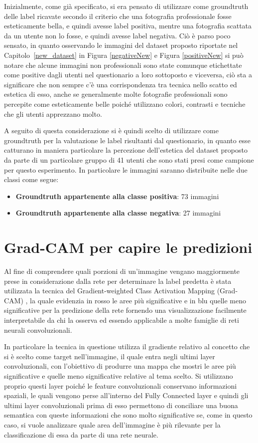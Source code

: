 Inizialmente, come già specificato, si era pensato di utilizzare come groundtruth delle label ricavate secondo il criterio che una fotografia professionale fosse esteticamente bella, e quindi avesse label positiva, mentre una fotografia scattata da un utente non lo fosse, e quindi avesse label negativa. Ciò è parso poco sensato, in quanto osservando le immagini del dataset proposto riportate nel Capitolo~\ref{new_dataset} in Figura \ref{negativeNew} e Figura \ref{positiveNew} si può notare che alcune immagini non professionali sono state comunque etichettate come positive dagli utenti nel questionario a loro sottoposto e viceversa, ciò sta a significare che non sempre c'è una corrispondenza tra tecnica nello scatto ed estetica di esso, anche se generalmente molte fotografie professionali sono percepite come esteticamente belle poiché utilizzano colori, contrasti e tecniche che gli utenti apprezzano molto.

A seguito di questa considerazione si è quindi scelto di utilizzare come groundtruth per la valutazione le label risultanti dal questionario, in quanto esse catturano in maniera particolare la percezione dell'estetica del dataset proposto da parte di un particolare gruppo di 41 utenti che sono stati presi come campione per questo esperimento. In particolare le immagini saranno distribuite nelle due classi come segue:
\begin{itemize}
\item \textbf{Groundtruth appartenente alla classe positiva}: 73 immagini
\item \textbf{Groundtruth appartenente alla classe negativa}: 27 immagini
\end{itemize}


\section{Grad-CAM per capire le predizioni}

Al fine di comprendere quali porzioni di un'immagine vengano maggiormente prese in considerazione dalla rete per determinare la label predetta è stata utilizzata la tecnica del Gradient-weighted Class Activation Mapping (Grad-CAM) \cite{selvaraju2017grad}, la quale evidenzia in rosso le aree più significative e in blu quelle meno significative per la predizione della rete fornendo una visualizzazione facilmente interpretabile da chi la osserva ed essendo applicabile a molte famiglie di reti neurali convoluzionali. 

In particolare la tecnica in questione utilizza il gradiente relativo al concetto che si è scelto come target nell'immagine, il quale entra negli ultimi layer convoluzionali, con l'obiettivo di produrre una mappa che mostri le aree più significative e quelle meno significative relative al tema scelto. Si utilizzano proprio questi layer poiché le feature convoluzionali conservano informazioni spaziali, le quali vengono perse all'interno del Fully Connected layer e quindi gli ultimi layer convoluzionali prima di esso permettono di conciliare una buona semantica con queste informazioni che sono molto significative se, come in questo caso, si vuole analizzare quale area dell'immagine è più rilevante per la classificazione di essa da parte di una rete neurale.

